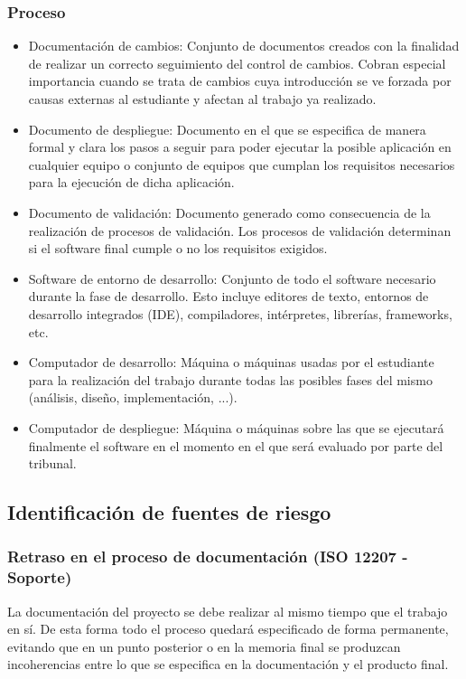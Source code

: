 \documentclass[10pt,a4paper]{article}
\begin{document}
			\subsubsection{Proceso}
			\begin{itemize}
			    \item Documentación de cambios: Conjunto de documentos creados con la finalidad de realizar un correcto seguimiento del control de cambios. Cobran especial importancia cuando se trata de cambios cuya introducción se ve forzada por causas externas al estudiante y afectan al trabajo ya realizado.
			    \item Documento de despliegue: Documento en el que se especifica de manera formal y clara los pasos a seguir para poder ejecutar la posible aplicación en cualquier equipo o conjunto de equipos que cumplan los requisitos necesarios para la ejecución de dicha aplicación.
			    \item Documento de validación: Documento generado como consecuencia de la realización de procesos de validación. Los procesos de validación determinan si el software final cumple o no los requisitos exigidos.
			    \item Software de entorno de desarrollo: Conjunto de todo el software necesario durante la fase de desarrollo. Esto incluye editores de texto, entornos de desarrollo integrados (IDE), compiladores, intérpretes, librerías, frameworks, etc.
                \item Computador de desarrollo: Máquina o máquinas usadas por el estudiante para la realización del trabajo durante todas las posibles fases del mismo (análisis, diseño, implementación, ...).	    
			    \item Computador de despliegue: Máquina o máquinas sobre las que se ejecutará finalmente el software en el momento en el que será evaluado por parte del tribunal.
			\end{itemize}
		\subsection{Identificación de fuentes de riesgo}
			\subsubsection{Retraso en el proceso de documentación (ISO 12207 - Soporte)}
			La documentación del proyecto se debe realizar al mismo tiempo que el trabajo en sí. De esta forma todo el proceso quedará especificado de forma permanente, evitando que en un punto posterior o en la memoria final se produzcan incoherencias entre lo que se especifica en la documentación y el producto final.
\end{document}
